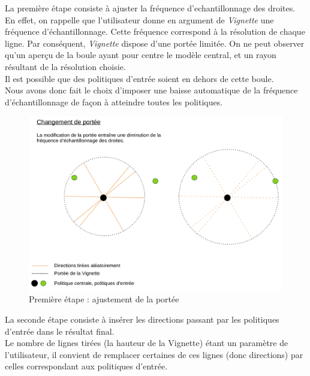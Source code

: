 \documentclass[12pt]{article}
\begin{document}
La première étape consiste à ajuster la fréquence d'echantillonnage des droites. \\

En effet, on rappelle que l'utilisateur donne en argument de \emph{Vignette} une fréquence d'échantillonnage. Cette fréquence correspond à la résolution de chaque ligne. Par conséquent, \emph{Vignette} dispose d'une portée limitée. On ne peut observer qu'un aperçu de la boule ayant pour centre le modèle central, et un rayon résultant de la résolution choisie. \\

Il est possible que des politiques d'entrée soient en dehors de cette boule. \\

\newpage
Nous avons donc fait le choix d'imposer une baisse automatique de la fréquence d'échantillonnage de façon à atteindre toutes les politiques. \\
 
\begin{figure}[htp]
    \centering
    \includegraphics[width=18cm]{Images/vignette_portee1}
    \caption{Première étape : ajustement de la portée}
    \label{fig:vignettePortee}
\end{figure}

La seconde étape consiste à insérer les directions passant par les politiques d'entrée dans le résultat final. \\

Le nombre de lignes tirées (la hauteur de la Vignette) étant un paramètre de l'utilisateur, il convient de remplacer certaines de ces lignes (donc directions) par celles correspondant aux politiques d'entrée. \\
\end{document}
